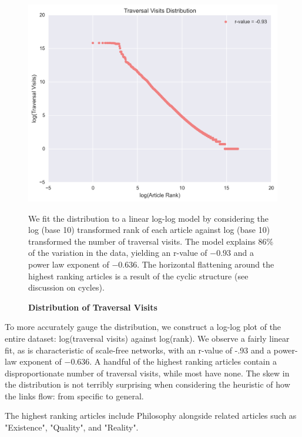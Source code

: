 \documentclass[pre,twocolumn,twoside,superscriptaddress,floatfix, aps, 10pt]{revtex4-1}
\begin{document}
\begin{figure}[tp!]
  \centering	
  \includegraphics[width=\columnwidth]{graphics/traversals_per_article.png} 
  \caption{
    \textbf{Distribution of Traversal Visits}
  }
  We fit the distribution to a linear log-log model by considering the log (base 10) transformed rank of each article against log (base 10) transformed the number of traversal visits. 
  The model explains $86\%$ of the variation in the data, yielding an r-value of $-0.93$ 
  and a power law exponent of $-0.636$. The horizontal flattening around the highest
  ranking articles is a result of the cyclic structure (see discussion on cycles).
  \label{fig:Distribution of Visits}

\end{figure}

To more accurately gauge the distribution, we construct a log-log plot of the entire dataset: log(traversal visits) against log(rank). We observe a fairly linear fit, as is characteristic of scale-free networks, with an r-value of -.93 and 
a power-law exponent of $-0.636$. A handful of the highest ranking articles contain a disproportionate number of traversal visits, while most have none. The skew in the distribution is not terribly surprising when considering the heuristic of how the links flow: from specific to general. 

The highest ranking articles include Philosophy alongside related articles such as "Existence", "Quality", and "Reality".
\end{document}
